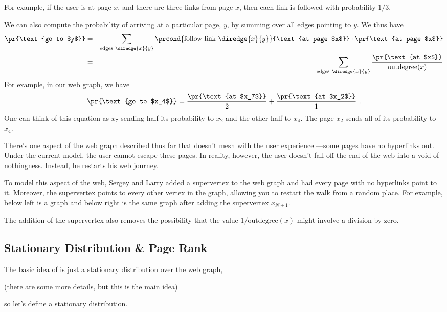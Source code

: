 For example, if the user is at page $x$, and there are three links from
page $x$, then each link is followed with probability $1/3$.

We can also compute the probability of arriving at a particular page, $y$,
by summing over all edges pointing to $y$.  We thus have
\begin{eqnarray}
  \pr{\text{go to $y$}} &=&  \sum_{\text{edges}\ \diredge{x}{y}}
  \prcond{\text{follow link}\ \diredge{x}{y}}{\text{at page $x$}} \cdot
  \pr{\text{at page $x$}} \nonumber\\
  &=& \sum_{\text{edges}\ \diredge{x}{y}} \frac{\pr{\text{at
      $x$}}}{\text{outdegree}(x)} \label{LN12:stepprob}
\end{eqnarray}
For example, in our web graph, we have
\[ \pr{\text{go to $x_4$}} = \frac{\pr{\text{at $x_7$}}}{2} +
\frac{\pr{\text{at $x_2$}}}{1} \ .
\]
One can think of this equation as $x_7$ sending half its probability to
$x_2$ and the other half to $x_4$. The page $x_2$ sends all of its
probability to $x_4$.

There's one aspect of the web graph described thus far that doesn't mesh
with the user experience ---some pages have no hyperlinks out.  Under the
current model, the user cannot escape these pages.  In reality, however,
the user doesn't fall off the end of the web into a void of nothingness.
Instead, he restarts his web journey.

To model this aspect of the web, Sergey and Larry added a supervertex to the
web graph and had every page with no hyperlinks point to it.  Moreover,
the supervertex points to every other vertex in the graph, allowing you to
restart the walk from a random place.  For example, below left is a graph
and below right is the same graph after adding the supervertex $x_{N+1}$.

\bigskip\centerline{
  \hspace{2cm}
}\bigskip

The addition of the supervertex also removes the possibility that the value
$1/\text{outdegree}(x)$ might involve a division by zero.

\subsection{Stationary Distribution \& Page Rank}

The basic idea of  is just a stationary distribution over
the web graph,
\begin{editingnotes}
(there are some more details, but this is the main idea)
\end{editingnotes}
so let's define a stationary distribution.

